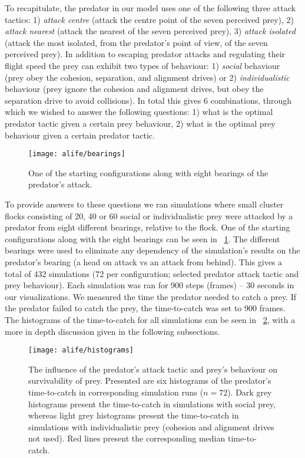 To recapitulate, the predator in our model uses one of the following three attack tactics: 1) \emph{attack centre} (\ie attack the centre point of the seven perceived prey), 2) \emph{attack nearest} (\ie attack the nearest of the seven perceived prey), 3) \emph{attack isolated} (\ie attack the most isolated, from the predator's point of view, of the seven perceived prey). In addition to escaping predator attacks and regulating their flight speed the prey can exhibit two types of behaviour: 1) \emph{social} behaviour (\ie prey obey the cohesion, separation, and alignment drives) or 2) \emph{individualistic} behaviour (\ie prey ignore the cohesion and alignment drives, but obey the separation drive to avoid collisions). In total this gives 6 combinations, through which we wished to answer the following questions: 1) what is the optimal predator tactic given a certain prey behaviour, 2) what is the optimal prey behaviour given a certain predator tactic.

\begin{figure}
	\texttt{[image: alife/bearings]}
	\caption{One of the starting configurations along with eight bearings of the predator's attack.}
	\label{figBearings}
\end{figure}

To provide answers to these questions we ran simulations where small cluster flocks consisting of 20, 40 or 60 social or individualistic prey were attacked by a predator from eight different bearings, relative to the flock. One of the starting configurations along with the eight bearings can be seen in \figurename~\ref{figBearings}. The different bearings were used to eliminate any dependency of the simulation's results on the predator's bearing (\eg a head on attack vs an attack from behind). This gives a total of 432 simulations (72 per configuration; selected predator attack tactic and prey behaviour). Each simulation was ran for 900 steps (frames) -- 30 seconds in our visualizations. We measured the time the predator needed to catch a prey. If the predator failed to catch the prey, the time-to-catch was set to 900 frames. The histograms of the time-to-catch for all simulations can be seen in \figurename~\ref{figHistograms}, with a more in depth discussion given in the following subsections.

\begin{figure}
	\texttt{[image: alife/histograms]}
	\caption{The influence of the predator's attack tactic and prey's behaviour on survivability of prey. Presented are six histograms of the predator's time-to-catch in corresponding simulation runs ($n=72$). Dark grey histograms present the time-to-catch in simulations with social prey, whereas light grey histograms present the time-to-catch in simulations with individualistic prey (cohesion and alignment drives not used). Red lines present the corresponding median time-to-catch.}
	\label{figHistograms}
\end{figure}

